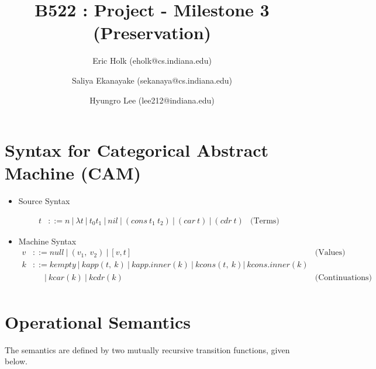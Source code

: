 \documentclass{article}
\title{B522 : Project - Milestone 3 (Preservation)}
\author{Eric Holk (eholk@cs.indiana.edu) \and Saliya Ekanayake (sekanaya@cs.indiana.edu) \and Hyungro Lee (lee212@indiana.edu)}
\begin{document}
\maketitle

\newcommand{\cons}{\ensuremath{\mathtt{cons}}}
\newcommand{\car}{\ensuremath{\mathtt{car}}}
\newcommand{\cdr}{\ensuremath{\mathtt{cdr}}}
\newcommand{\vnull}{\ensuremath{\mathtt{null}}}
\newcommand{\nil}{\ensuremath{\mathtt{nil}}}
\newcommand{\nils}{\ensuremath{\mathit{nil}}}
\newcommand{\addone}{\ensuremath{\mathtt{add1}}}
\newcommand{\gap}{\ensuremath{\quad}}

\section{Syntax for Categorical Abstract Machine (CAM)}

\begin{itemize}

\item Source Syntax

\[
\begin{array}{rlr}
  t & ::= n ~| ~\lambda t ~| ~t_0 t_1 ~| ~nil ~| ~(cons ~t_1 ~t_2) ~| ~(car ~t)
  ~| ~(cdr ~t) & \textrm{(Terms)}
\end{array}
\]


\item Machine Syntax
\[
\begin{array}{rlr}
v & ::= null ~| ~(v_1, ~v_2) ~| ~[v, t] & \textrm{(Values)} \\
k & ::= kempty ~| ~kapp(t, ~k) ~| ~kapp.inner(k) ~| ~kcons(t, ~k) | ~kcons.inner(k) \\
& \gap ~~| ~kcar(k) ~| ~kcdr(k) & \textrm{(Continuations)} \\
\end{array}
\]

\end{itemize}

\section{Operational Semantics}

The semantics are defined by two mutually recursive transition
functions, given below.
\end{document}
